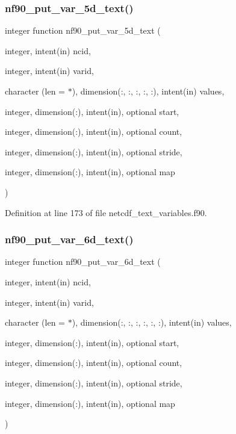 \subsubsection{\texorpdfstring{nf90\+\_\+put\+\_\+var\+\_\+5d\+\_\+text()}{nf90\_put\_var\_5d\_text()}}
{\footnotesize\ttfamily integer function nf90\+\_\+put\+\_\+var\+\_\+5d\+\_\+text (\begin{DoxyParamCaption}\item[{integer, intent(in)}]{ncid,  }\item[{integer, intent(in)}]{varid,  }\item[{character (len = $\ast$), dimension(\+:, \+:, \+:, \+:, \+:), intent(in)}]{values,  }\item[{integer, dimension(\+:), intent(in), optional}]{start,  }\item[{integer, dimension(\+:), intent(in), optional}]{count,  }\item[{integer, dimension(\+:), intent(in), optional}]{stride,  }\item[{integer, dimension(\+:), intent(in), optional}]{map }\end{DoxyParamCaption})}



Definition at line 173 of file netcdf\+\_\+text\+\_\+variables.\+f90.

\mbox{\label{netcdf__text__variables_8f90_a563af472ff0a6b2ead693e554c761029}} 
\subsubsection{\texorpdfstring{nf90\+\_\+put\+\_\+var\+\_\+6d\+\_\+text()}{nf90\_put\_var\_6d\_text()}}
{\footnotesize\ttfamily integer function nf90\+\_\+put\+\_\+var\+\_\+6d\+\_\+text (\begin{DoxyParamCaption}\item[{integer, intent(in)}]{ncid,  }\item[{integer, intent(in)}]{varid,  }\item[{character (len = $\ast$), dimension(\+:, \+:, \+:, \+:, \+:, \+:), intent(in)}]{values,  }\item[{integer, dimension(\+:), intent(in), optional}]{start,  }\item[{integer, dimension(\+:), intent(in), optional}]{count,  }\item[{integer, dimension(\+:), intent(in), optional}]{stride,  }\item[{integer, dimension(\+:), intent(in), optional}]{map }\end{DoxyParamCaption})}



